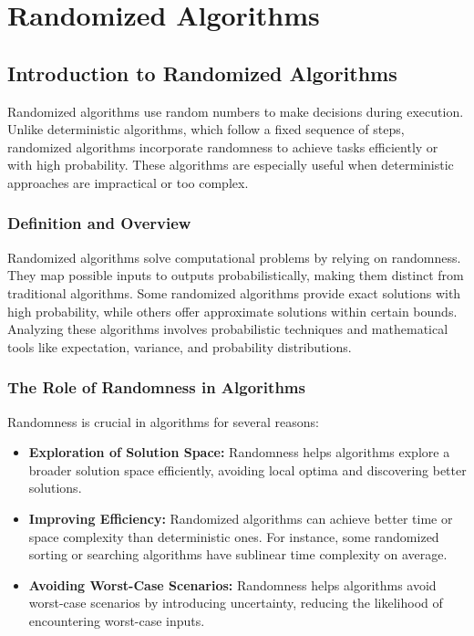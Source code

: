 \documentclass[12pt]{book} %
\begin{document}
\chapter{Randomized Algorithms}

\section{Introduction to Randomized Algorithms}

Randomized algorithms use random numbers to make decisions during execution. Unlike deterministic algorithms, which follow a fixed sequence of steps, randomized algorithms incorporate randomness to achieve tasks efficiently or with high probability. These algorithms are especially useful when deterministic approaches are impractical or too complex.

\subsection{Definition and Overview}

Randomized algorithms solve computational problems by relying on randomness. They map possible inputs to outputs probabilistically, making them distinct from traditional algorithms. Some randomized algorithms provide exact solutions with high probability, while others offer approximate solutions within certain bounds. Analyzing these algorithms involves probabilistic techniques and mathematical tools like expectation, variance, and probability distributions.

\subsection{The Role of Randomness in Algorithms}

Randomness is crucial in algorithms for several reasons:

\begin{itemize}
    \item \textbf{Exploration of Solution Space:} Randomness helps algorithms explore a broader solution space efficiently, avoiding local optima and discovering better solutions.
    \item \textbf{Improving Efficiency:} Randomized algorithms can achieve better time or space complexity than deterministic ones. For instance, some randomized sorting or searching algorithms have sublinear time complexity on average.
    \item \textbf{Avoiding Worst-Case Scenarios:} Randomness helps algorithms avoid worst-case scenarios by introducing uncertainty, reducing the likelihood of encountering worst-case inputs.
\end{itemize}
\end{document}

